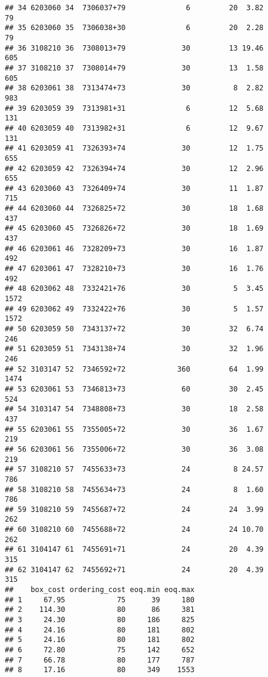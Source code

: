 \documentclass[
]{article}
\begin{document}
\begin{verbatim}
## 34 6203060 34  7306037+79              6         20  3.82              79
## 35 6203060 35  7306038+30              6         20  2.28              79
## 36 3108210 36  7308013+79             30         13 19.46             605
## 37 3108210 37  7308014+79             30         13  1.58             605
## 38 6203061 38  7313474+73             30          8  2.82             983
## 39 6203059 39  7313981+31              6         12  5.68             131
## 40 6203059 40  7313982+31              6         12  9.67             131
## 41 6203059 41  7326393+74             30         12  1.75             655
## 42 6203059 42  7326394+74             30         12  2.96             655
## 43 6203060 43  7326409+74             30         11  1.87             715
## 44 6203060 44  7326825+72             30         18  1.68             437
## 45 6203060 45  7326826+72             30         18  1.69             437
## 46 6203061 46  7328209+73             30         16  1.87             492
## 47 6203061 47  7328210+73             30         16  1.76             492
## 48 6203062 48  7332421+76             30          5  3.45            1572
## 49 6203062 49  7332422+76             30          5  1.57            1572
## 50 6203059 50  7343137+72             30         32  6.74             246
## 51 6203059 51  7343138+74             30         32  1.96             246
## 52 3103147 52  7346592+72            360         64  1.99            1474
## 53 6203061 53  7346813+73             60         30  2.45             524
## 54 3103147 54  7348808+73             30         18  2.58             437
## 55 6203061 55  7355005+72             30         36  1.67             219
## 56 6203061 56  7355006+72             30         36  3.08             219
## 57 3108210 57  7455633+73             24          8 24.57             786
## 58 3108210 58  7455634+73             24          8  1.60             786
## 59 3108210 59  7455687+72             24         24  3.99             262
## 60 3108210 60  7455688+72             24         24 10.70             262
## 61 3104147 61  7455691+71             24         20  4.39             315
## 62 3104147 62  7455692+71             24         20  4.39             315
##    box_cost ordering_cost eoq.min eoq.max
## 1     67.95            75      39     180
## 2    114.30            80      86     381
## 3     24.30            80     186     825
## 4     24.16            80     181     802
## 5     24.16            80     181     802
## 6     72.80            75     142     652
## 7     66.78            80     177     787
## 8     17.16            80     349    1553

\end{verbatim}
\end{document}
